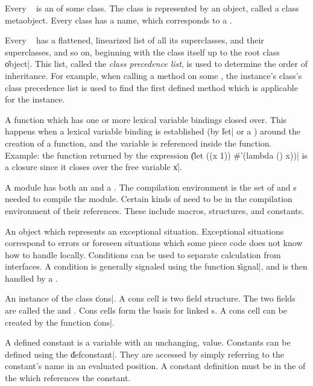 \begin{description}
	{Every \Talk\  is an  of some
	class.  The class is represented by an object, called a class
	metaobject.  Every class has a name, which corresponds to a
	.}

	{Every \Talk\  has a flattened, linearized list of
	all its superclasses, and their superclasses, and so on,
	beginning with the class itself up to the root class
	\|object|.  This list, called the {\em class precedence list},
	is used to determine the order of inheritance.  For example,
	when calling a method on some , the instance's
	class's class precedence list is used to find the first
	defined method which is applicable for the instance.}

	{A function which has one or more lexical variable bindings
	closed over.  This happens when a lexical variable binding is
	established (by \|let| or a ) around the
	creation of a function, and the variable is referenced inside
	the function.  Example:  the function returned by the
	expression \|(let ((x 1)) \#'(lambda () x))| is a closure since
	it closes over the free variable \|x|.}

	{A module has both an  and a
	.  The compilation environment
	is the set of  and s needed to
	compile the module.  Certain kinds of  need
	to be in the compilation environment of their references.
	These include macros, structures, and constants.}

	{An object which represents an exceptional situation.
	Exceptional situations correspond to errors or foreseen
	situations which some piece code does not know how to handle
	locally.  Conditions can be used to separate calculation from
	interfaces.  A condition is generally signaled using the
	function \|signal|, and is then handled by a .}

	{An instance of the class \|cons|.  A cons cell is two field
	structure.  The two fields are called the  and
	.  Cons cells form the basis for linked
	s.  A cons cell can be created by the function
	\|cons|.}

	{A defined constant is a variable with an unchanging,
	 value.  Constants can be defined using the
	 \|defconstant|.  They are accessed by
	simply referring to the constant's name in an evaluated
	position.  A constant definition must be in the
	 of the  which
	references the constant.}


\end{description}
